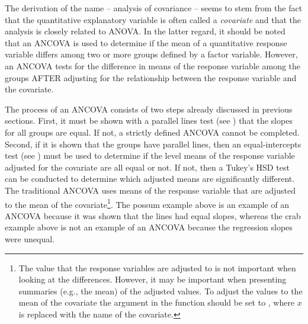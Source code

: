 \documentclass[10pt,openany]{book}\usepackage[]{graphicx}\usepackage[]{color}
\begin{document}

The derivation of the name -- analysis of covariance -- seems to stem from the fact that the quantitative explanatory variable is often called a \emph{covariate} and that the analysis is closely related to ANOVA.  In the latter regard, it should be noted that an ANCOVA is used to determine if the mean of a quantitative response variable differs among two or more groups defined by a factor variable.  However, an ANCOVA tests for the difference in means of the response variable among the groups AFTER adjusting for the relationship between the response variable and the covariate.


\vspace{-12pt}

The process of an ANCOVA consists of two steps already discussed in previous sections.  First, it must be shown with a parallel lines test (see ) that the slopes for all groups are equal.  If not, a strictly defined ANCOVA cannot be completed.  Second, if it is shown that the groups have parallel lines, then an equal-intercepts test (see ) must be used to determine if the level means of the response variable adjusted for the covariate are all equal or not.  If not, then a Tukey's HSD test can be conducted to determine which adjusted means are significantly different.  The traditional ANCOVA uses means of the response variable that are adjusted to the mean of the covariate\footnote{The value that the response variables are adjusted to is not important when looking at the differences.  However, it may be important when presenting summaries (e.g., the mean) of the adjusted values.  To adjust the values to the mean of the covariate the  argument in the  function should be set to , where $x$ is replaced with the name of the covariate.}.  The possum example above is an example of an ANCOVA because it was shown that the lines had equal slopes, whereas the crab example above is not an example of an ANCOVA because the regression slopes were unequal.

\end{document}
